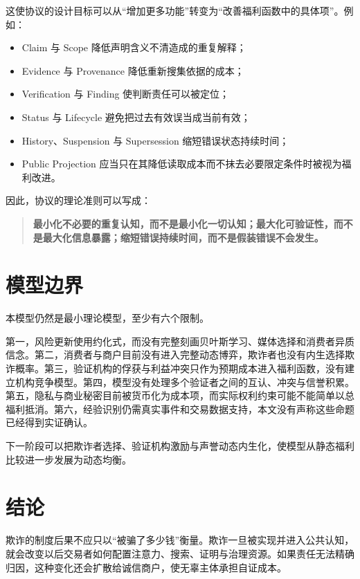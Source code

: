 \documentclass[UTF8,12pt]{ctexart}
\begin{document}
这使协议的设计目标可以从“增加更多功能”转变为“改善福利函数中的具体项”。例如：

\begin{itemize}[leftmargin=2.2em]
  \item Claim 与 Scope 降低声明含义不清造成的重复解释；
  \item Evidence 与 Provenance 降低重新搜集依据的成本；
  \item Verification 与 Finding 使判断责任可以被定位；
  \item Status 与 Lifecycle 避免把过去有效误当成当前有效；
  \item History、Suspension 与 Supersession 缩短错误状态持续时间；
  \item Public Projection 应当只在其降低读取成本而不抹去必要限定条件时被视为福利改进。
\end{itemize}

因此，协议的理论准则可以写成：

\begin{quote}
\textbf{最小化不必要的重复认知，而不是最小化一切认知；最大化可验证性，而不是最大化信息暴露；缩短错误持续时间，而不是假装错误不会发生。}
\end{quote}

\section{模型边界}

本模型仍然是最小理论模型，至少有六个限制。

第一，风险更新使用约化式，而没有完整刻画贝叶斯学习、媒体选择和消费者异质信念。第二，消费者与商户目前没有进入完整动态博弈，欺诈者也没有内生选择欺诈概率。第三，验证机构的俘获与利益冲突只作为预期成本进入福利函数，没有建立机构竞争模型。第四，模型没有处理多个验证者之间的互认、冲突与信誉积累。第五，隐私与商业秘密目前被货币化为成本项，而实际权利约束可能不能简单以总福利抵消。第六，经验识别仍需真实事件和交易数据支持，本文没有声称这些命题已经得到实证确认。

下一阶段可以把欺诈者选择、验证机构激励与声誉动态内生化，使模型从静态福利比较进一步发展为动态均衡。

\section{结论}

欺诈的制度后果不应只以“被骗了多少钱”衡量。欺诈一旦被实现并进入公共认知，就会改变以后交易者如何配置注意力、搜索、证明与治理资源。如果责任无法精确归因，这种变化还会扩散给诚信商户，使无辜主体承担自证成本。
\end{document}
